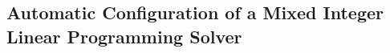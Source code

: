 \documentclass{article}
\begin{document}
%
%
%
%
%
%
%
%
%












\subsection{Automatic Configuration of a Mixed Integer Linear Programming Solver}\label{exp:mip_opt}
\end{document}
